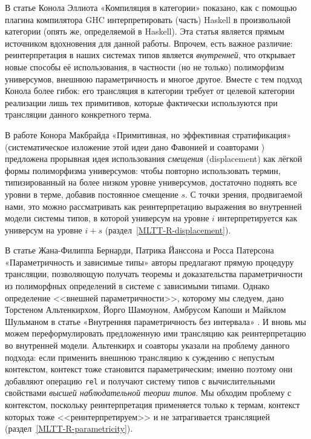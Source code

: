 В статье Конола Эллиота «Компиляция в категории»
\cite{Elliott:Compcat2017} показано, как с помощью
плагина компилятора GHC интерпретировать (часть)
Haskell в произвольной категории (опять же,
определяемой в Haskell). Эта статья является прямым
источником вдохновения для данной работы. Впрочем, есть
важное различие: реинтерпретация в наших системах типов
является \emph{внутренней}, что открывает новые способы
её использования, в частности (но не только)
полиморфизм универсумов, внешнюю параметричность и
многое другое. Вместе с тем подход Конола более гибок:
его трансляция в категории требует от целевой категории
реализации лишь тех примитивов, которые фактически
используются при трансляции данного конкретного терма.

В работе Конора Макбрайда «Примитивная, но эффективная
стратификация»
\cite{McBride:Crude2011,McBride:Crude2012}
(систематическое изложение этой идеи дано Фавонией и
соавторами \cite{Favonia:Displacement2023}) предложена
прорывная идея использования \emph{смещения}
(displacement) как лёгкой формы полиморфизма
универсумов: чтобы повторно использовать термин,
типизированный на более низком уровне универсумов,
достаточно поднять все уровни в терме, добавив
постоянное смещение $s$. С точки зрения, продвигаемой
нами, это можно рассматривать как реинтерпретацию
выражения во внутренней модели системы типов, в которой
универсум на уровне $i$ интерпретируется как универсум
на уровне $i+s$ (раздел~\ref{MLTT-R-displacement}).

В статье Жана-Филиппа Бернарди, Патрика Йанссона и
Росса Патерсона «Параметричность и зависимые типы»
\cite{Bernardy:Parametricity2010} авторы предлагают
прямую процедуру трансляции, позволяющую получать
теоремы и доказательства параметричности из полиморфных
определений в системе с зависимыми типами. Однако
определение <<внешней параметричности>>, которому мы
следуем, дано Торстеном Альтенкирхом, Йорго Шамоуном,
Амбрусом Капоши и Майклом Шульманом в статье
«Внутренняя параметричность без интервала»
\cite{Altenkirch:Parametricity2024}. И вновь мы можем
переформулировать предложенную ими трансляцию как
реинтерпретацию во внутренней модели. Альтенкирх и
соавторы указали на проблему данного подхода: если
применить внешнюю трансляцию к суждению с непустым
контекстом, контекст тоже становится параметрическим;
именно поэтому они добавляют операцию \texttt{rel} и
получают систему типов с вычислительными свойствами
\emph{высшей наблюдательной теории типов}. Мы обходим
проблему с контекстом, поскольку реинтерпретация
применяется только к термам, контекст которых тоже
<<реинтерпретируем>> и не затрагивается трансляцией
(раздел~\ref{MLTT-R-parametricity}).

